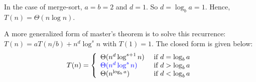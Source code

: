In the case of merge-sort, $a = b = 2$ and $d = 1$. So $d = \log_b a = 1$.
Hence, $T(n) = \Theta(n\log n)$.

A more generalized form of master's theorem is to solve this recurrence:
$T(n) = aT(n/b) + n^d \log^s n$ with $T(1) = 1$. The closed form is given below: %
\begin{displaymath}
T(n) = \left\{
\begin{array}{llll}
\Theta(n^d \log^{s+1} n) & \textrm{ if } d = \log_b a \\
\textcolor{blue}{\Theta(n^d \log^s n)} & \textrm{ if } d > \log_b a \\
\Theta(n^{\log_b a}) & \textrm{ if } d < \log_b a \\
\end{array}
\right.
\end{displaymath}
